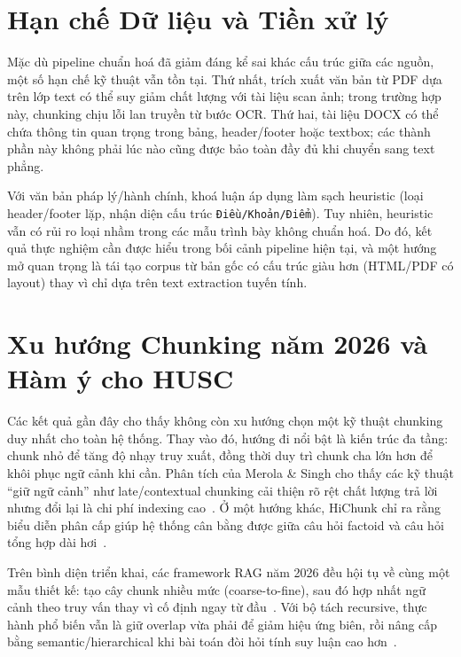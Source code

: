 \documentclass[12pt,a4paper]{report}
\theoremstyle{plain}
\theoremstyle{definition}
\begin{document}
	\section{Hạn chế Dữ liệu và Tiền xử lý}
	\label{sec:data_preprocess_limits}
	
	Mặc dù pipeline chuẩn hoá đã giảm đáng kể sai khác cấu trúc giữa các nguồn,
	một số hạn chế kỹ thuật vẫn tồn tại. Thứ nhất, trích xuất văn bản từ PDF dựa
	trên lớp text có thể suy giảm chất lượng với tài liệu scan ảnh; trong trường
	hợp này, chunking chịu lỗi lan truyền từ bước OCR. Thứ hai, tài liệu DOCX có
	thể chứa thông tin quan trọng trong bảng, header/footer hoặc textbox; các thành
	phần này không phải lúc nào cũng được bảo toàn đầy đủ khi chuyển sang text phẳng.
	
	Với văn bản pháp lý/hành chính, khoá luận áp dụng làm sạch heuristic (loại
	header/footer lặp, nhận diện cấu trúc \texttt{Điều/Khoản/Điểm}). Tuy nhiên,
	heuristic vẫn có rủi ro loại nhầm trong các mẫu trình bày không chuẩn hoá.
	Do đó, kết quả thực nghiệm cần được hiểu trong bối cảnh pipeline hiện tại, và
	một hướng mở quan trọng là tái tạo corpus từ bản gốc có cấu trúc giàu hơn
	(HTML/PDF có layout) thay vì chỉ dựa trên text extraction tuyến tính.
	
	\section{Xu hướng Chunking năm 2026 và Hàm ý cho HUSC}
	\label{sec:trend_2026_chunking}
	
	Các kết quả gần đây cho thấy không còn xu hướng chọn một kỹ thuật chunking duy
	nhất cho toàn hệ thống. Thay vào đó, hướng đi nổi bật là kiến trúc đa tầng:
	chunk nhỏ để tăng độ nhạy truy xuất, đồng thời duy trì chunk cha lớn hơn để
	khôi phục ngữ cảnh khi cần. Phân tích của Merola \& Singh cho thấy các kỹ thuật
	``giữ ngữ cảnh'' như late/contextual chunking cải thiện rõ rệt chất lượng trả
	lời nhưng đổi lại là chi phí indexing cao~\cite{merola2025reconstructing}.
	Ở một hướng khác, HiChunk chỉ ra rằng biểu diễn phân cấp giúp hệ thống cân bằng
	được giữa câu hỏi factoid và câu hỏi tổng hợp dài hơi~\cite{lu2025hichunk}.
	
	Trên bình diện triển khai, các framework RAG năm 2026 đều hội tụ về cùng một
	mẫu thiết kế: tạo cây chunk nhiều mức (coarse-to-fine), sau đó hợp nhất ngữ
	cảnh theo truy vấn thay vì cố định ngay từ đầu~\cite{llamaindex2026docs}.
	Với bộ tách recursive, thực hành phổ biến vẫn là giữ overlap vừa phải để giảm
	hiệu ứng biên, rồi nâng cấp bằng semantic/hierarchical khi bài toán đòi hỏi
	tính suy luận cao hơn~\cite{langchain2026docs}.
	
\end{document}
